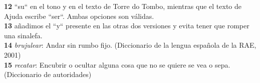 \noindent\textbf{12} ``su`` en el tono y en el texto de Torre do Tombo, mientras que el texto de Ajuda escribe ``ser``. Ambas opciones son válidas.\\
\noindent\textbf{13} añadimos el ``y`` presente en las otras dos versiones y evita tener que romper una sinalefa.\\
\noindent\textbf{14} \textit{brujulear}: Andar sin rumbo fijo. (Diccionario de la lengua española de la RAE, 2001)\\
\noindent\textbf{15} \textit{recatar}: Encubrir o ocultar alguna cosa que no se quiere se vea o sepa. (Diccionario de autoridades)


